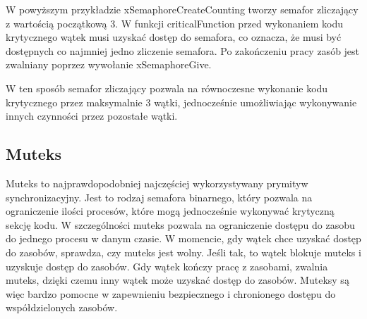 
W powyższym przykładzie xSemaphoreCreateCounting tworzy semafor zliczający z wartością początkową 3.
W funkcji criticalFunction przed wykonaniem kodu krytycznego wątek musi uzyskać dostęp do semafora, co oznacza,
że musi być dostępnych co najmniej jedno zliczenie semafora. Po zakończeniu pracy zasób jest zwalniany poprzez wywołanie xSemaphoreGive.

W ten sposób semafor zliczający pozwala na równoczesne wykonanie kodu krytycznego przez maksymalnie 3 wątki,
jednocześnie umożliwiając wykonywanie innych czynności przez pozostałe wątki.

\subsection{Muteks}
Muteks to najprawdopodobniej najczęściej wykorzystywany prymityw synchronizacyjny. Jest to rodzaj semafora binarnego, który pozwala na ograniczenie
ilości procesów, które mogą jednocześnie wykonywać krytyczną sekcję kodu. W szczególności muteks pozwala na ograniczenie dostępu do zasobu
do jednego procesu w danym czasie. W momencie, gdy wątek chce uzyskać dostęp do zasobów, sprawdza, czy muteks jest wolny. Jeśli tak,
to wątek blokuje muteks i uzyskuje dostęp do zasobów. Gdy wątek kończy pracę z zasobami, zwalnia muteks, dzięki czemu inny wątek może
uzyskać dostęp do zasobów. Muteksy są więc bardzo pomocne w zapewnieniu bezpiecznego i chronionego dostępu do współdzielonych zasobów.


